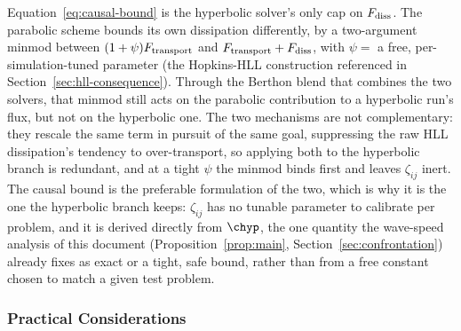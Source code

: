 Equation~\eqref{eq:causal-bound} is the hyperbolic solver's only cap on
$F_{\rm diss}$. The parabolic scheme bounds its own dissipation
differently, by a two-argument minmod between $(1+\psi)F_{\rm transport}$
and $F_{\rm transport}+F_{\rm diss}$, with
$\psi=$ a free,
per-simulation-tuned parameter (the Hopkins-HLL construction referenced in
Section~\ref{sec:hll-consequence}). Through the Berthon blend that
combines the two solvers, that minmod still acts on the parabolic
contribution to a hyperbolic run's flux, but not on the hyperbolic one.
The two mechanisms are not complementary: they rescale the same term in
pursuit of the same goal, suppressing the raw HLL dissipation's tendency
to over-transport, so applying both to the hyperbolic branch is
redundant, and at a tight $\psi$ the minmod binds first and leaves
$\zeta_{ij}$ inert. The causal bound is the preferable formulation of the
two, which is why it is the one the hyperbolic branch keeps: $\zeta_{ij}$
has no tunable parameter to calibrate per problem, and it is derived
directly from $\chyp$, the one quantity the wave-speed analysis of this
document (Proposition~\ref{prop:main}, Section~\ref{sec:confrontation})
already fixes as exact or a tight, safe bound, rather than from a free
constant chosen to match a given test problem.

\subsubsection{Practical Considerations}

